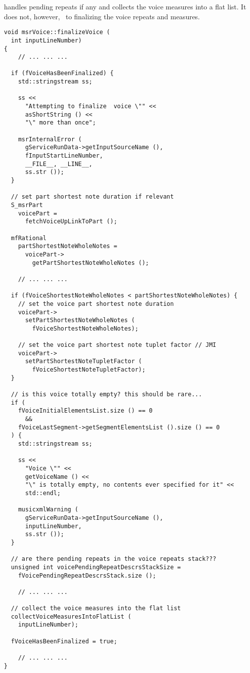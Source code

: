  handles pending repeats if any and collects the voice measures into a flat list. It does not, however, \cascade\ to finalizing the voice repeats and measures.
\begin{lstlisting}[language=CPlusPlus]
void msrVoice::finalizeVoice (
  int inputLineNumber)
{
	// ... ... ...

  if (fVoiceHasBeenFinalized) {
    std::stringstream ss;

    ss <<
      "Attempting to finalize  voice \"" <<
      asShortString () <<
      "\" more than once";

    msrInternalError (
      gServiceRunData->getInputSourceName (),
      fInputStartLineNumber,
      __FILE__, __LINE__,
      ss.str ());
  }

  // set part shortest note duration if relevant
  S_msrPart
    voicePart =
      fetchVoiceUpLinkToPart ();

  mfRational
    partShortestNoteWholeNotes =
      voicePart->
        getPartShortestNoteWholeNotes ();

	// ... ... ...

  if (fVoiceShortestNoteWholeNotes < partShortestNoteWholeNotes) {
    // set the voice part shortest note duration
    voicePart->
      setPartShortestNoteWholeNotes (
        fVoiceShortestNoteWholeNotes);

    // set the voice part shortest note tuplet factor // JMI
    voicePart->
      setPartShortestNoteTupletFactor (
        fVoiceShortestNoteTupletFactor);
  }

  // is this voice totally empty? this should be rare...
  if (
    fVoiceInitialElementsList.size () == 0
      &&
    fVoiceLastSegment->getSegmentElementsList ().size () == 0
  ) {
    std::stringstream ss;

    ss <<
      "Voice \"" <<
      getVoiceName () <<
      "\" is totally empty, no contents ever specified for it" <<
      std::endl;

    musicxmlWarning (
      gServiceRunData->getInputSourceName (),
      inputLineNumber,
      ss.str ());
  }

  // are there pending repeats in the voice repeats stack???
  unsigned int voicePendingRepeatDescrsStackSize =
    fVoicePendingRepeatDescrsStack.size ();

	// ... ... ...

  // collect the voice measures into the flat list
  collectVoiceMeasuresIntoFlatList (
    inputLineNumber);

  fVoiceHasBeenFinalized = true;

	// ... ... ...
}
\end{lstlisting}


